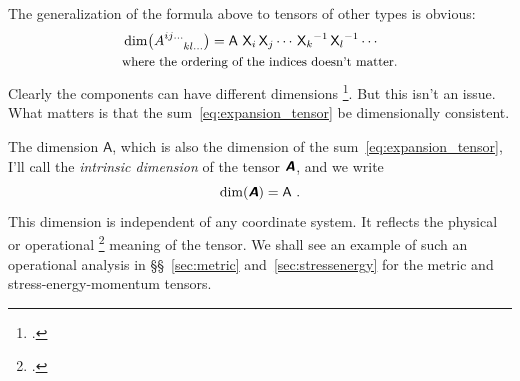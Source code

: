 \documentclass[\ifafour a4paper,12pt,\else a5paper,10pt,\fi%
onecolumn,oneside,article,%
british%
]{memoir}
\theoremstyle{remark}
\theoremstyle{innote}
\newcommand*{\mathte}[1]{\textbf{\textit{\textsf{#1}}}}
\newcommand*{\citep}{\footcites}
\renewcommand*{\|}[1][]{\nonscript\,#1\vert\nonscript\;\mathopen{}}
\newcommand*{\sect}{\S}%
\newcommand*{\sects}{\S\S}%
\newcommand*{\cf}{{cf.}}
\newcommand*{\Un}{\textsf{1}}
\newcommand*{\Le}{\textsf{L}}
\newcommand*{\Ti}{\textsf{T}}
\newcommand*{\Ma}{\textsf{M}}
\newcommand*{\Te}{\Theta}
\newcommand*{\Xx}{\textsf{X}}
\newcommand*{\Aa}{\textsf{A}}
\newcommand*{\yA}{\mathte{A}}
\renewcommand*{\i}{\indices}
\begin{document}
The generalization of the formula above to tensors of other types is obvious:
\begin{equation}
  \label{eq:dim_component_generic}
  \begin{aligned}
&\dim\bigl(A\i{^{ij\dotso}_{kl\dotso}}\bigr) = \Aa\ {\Xx_{i}}\,{\Xx_{j}}\dotsm\,
  {\Xx_{k}}^{-1}\,{\Xx_{l}}^{-1}\dotsm \\
  &\text{\small where the ordering of the indices doesn't matter.}
  \end{aligned}
\end{equation}
Clearly the components can have different dimensions
\citep[\cf\ the discussion in][\sect~IV.5 p.~179]{synge1960b}. But this isn't
an issue. What matters is that the sum~\eqref{eq:expansion_tensor} be
dimensionally consistent.


\medskip

The dimension $\Aa$, which is also the dimension of the
sum~\eqref{eq:expansion_tensor}, I'll call the \emph{intrinsic dimension}
of the tensor $\yA$, and we write
\begin{equation}
  \label{eq:abs_dim}
  \dim(\yA) = \Aa\ .
\end{equation}
This dimension is independent of any coordinate system. It reflects the
physical or operational \citep{bridgman1927_r1958}[see
also][\sect~A.2]{synge1960}[\sects~A.3--4]{truesdelletal1960} meaning of
the tensor. We shall see an example of such an operational analysis in
\sects~\ref{sec:metric} and~\ref{sec:stressenergy} for the metric and
stress-energy-momentum tensors.
\end{document}
